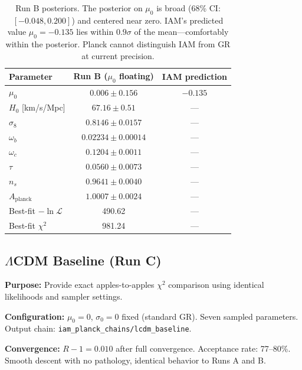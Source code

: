 \documentclass[11pt,letterpaper]{article}
\begin{document}
\begin{table}[h]
\centering
\begin{tabular}{lcc}
\toprule
Parameter & Run B ($\mu_0$ floating) & IAM prediction \\
\midrule
$\mu_0$ & $0.006 \pm 0.156$ & $-0.135$ \\
$H_0$ [km/s/Mpc] & $67.16 \pm 0.51$ & --- \\
$\sigma_8$ & $0.8146 \pm 0.0157$ & --- \\
$\omega_b$ & $0.02234 \pm 0.00014$ & --- \\
$\omega_c$ & $0.1204 \pm 0.0011$ & --- \\
$\tau$ & $0.0560 \pm 0.0073$ & --- \\
$n_s$ & $0.9641 \pm 0.0040$ & --- \\
$A_\mathrm{planck}$ & $1.0007 \pm 0.0024$ & --- \\
\midrule
Best-fit $-\ln\mathcal{L}$ & 490.62 & --- \\
Best-fit $\chi^2$ & 981.24 & --- \\
\bottomrule
\end{tabular}
\caption{Run B posteriors. The posterior on $\mu_0$ is broad (68\% CI: $[-0.048, 0.200]$) and centered near zero. IAM's predicted value $\mu_0 = -0.135$ lies within $0.9\sigma$ of the mean---comfortably within the posterior. Planck cannot distinguish IAM from GR at current precision.}
\label{tab:runB}
\end{table}

\subsection{$\Lambda$CDM Baseline (Run C)}

\textbf{Purpose:} Provide exact apples-to-apples $\chi^2$ comparison using identical likelihoods and sampler settings.

\textbf{Configuration:} $\mu_0 = 0$, $\sigma_0 = 0$ fixed (standard GR). Seven sampled parameters. Output chain: \texttt{iam\_planck\_chains/lcdm\_baseline}.

\textbf{Convergence:} $R-1 = 0.010$ after full convergence. Acceptance rate: 77--80\%. Smooth descent with no pathology, identical behavior to Runs A and B.
\end{document}
